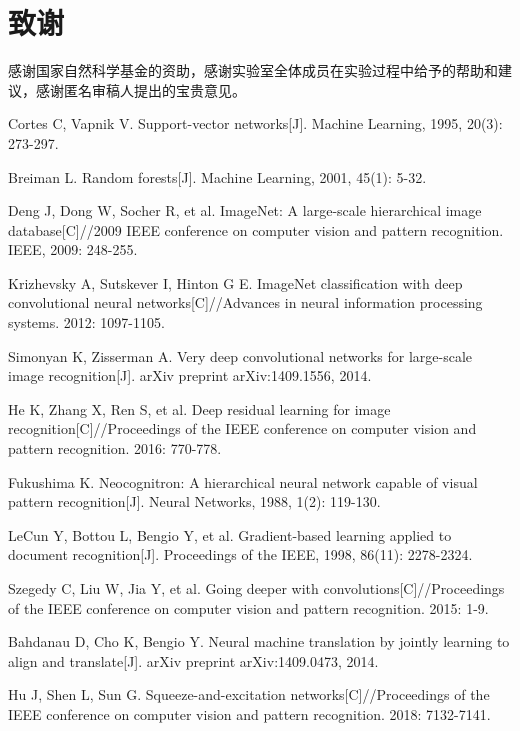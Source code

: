 \documentclass[a4paper,12pt]{article}
\newenvironment{acknowledgments}{
    \section*{\heiti\fontsize{10.5pt}{12pt}\selectfont 致谢}
    \kaishu\fontsize{10.5pt}{12pt}\selectfont
}{}
\begin{document}
\begin{acknowledgments}
感谢国家自然科学基金的资助，感谢实验室全体成员在实验过程中给予的帮助和建议，感谢匿名审稿人提出的宝贵意见。
\end{acknowledgments}


\begin{thebibliography}{20}

Cortes C, Vapnik V. Support-vector networks[J]. Machine Learning, 1995, 20(3): 273-297.

Breiman L. Random forests[J]. Machine Learning, 2001, 45(1): 5-32.

Deng J, Dong W, Socher R, et al. ImageNet: A large-scale hierarchical image database[C]//2009 IEEE conference on computer vision and pattern recognition. IEEE, 2009: 248-255.

Krizhevsky A, Sutskever I, Hinton G E. ImageNet classification with deep convolutional neural networks[C]//Advances in neural information processing systems. 2012: 1097-1105.

Simonyan K, Zisserman A. Very deep convolutional networks for large-scale image recognition[J]. arXiv preprint arXiv:1409.1556, 2014.

He K, Zhang X, Ren S, et al. Deep residual learning for image recognition[C]//Proceedings of the IEEE conference on computer vision and pattern recognition. 2016: 770-778.

Fukushima K. Neocognitron: A hierarchical neural network capable of visual pattern recognition[J]. Neural Networks, 1988, 1(2): 119-130.

LeCun Y, Bottou L, Bengio Y, et al. Gradient-based learning applied to document recognition[J]. Proceedings of the IEEE, 1998, 86(11): 2278-2324.

Szegedy C, Liu W, Jia Y, et al. Going deeper with convolutions[C]//Proceedings of the IEEE conference on computer vision and pattern recognition. 2015: 1-9.

Bahdanau D, Cho K, Bengio Y. Neural machine translation by jointly learning to align and translate[J]. arXiv preprint arXiv:1409.0473, 2014.

Hu J, Shen L, Sun G. Squeeze-and-excitation networks[C]//Proceedings of the IEEE conference on computer vision and pattern recognition. 2018: 7132-7141.

\end{thebibliography}
\end{document}
